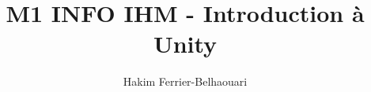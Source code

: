 \documentclass[10pt]{beamer}
\begin{document}
	\author{Hakim Ferrier-Belhaouari}
	\title{M1 INFO IHM - Introduction à Unity}
	\begin{frame}[plain]
		\maketitle
	\end{frame}

	

\end{document}
